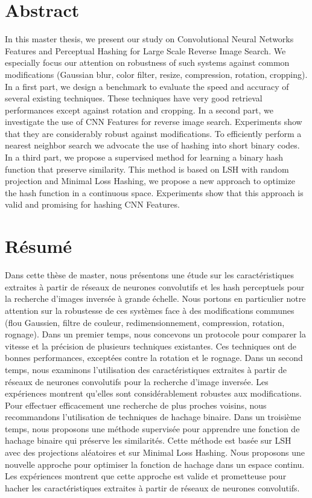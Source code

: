 \thispagestyle{plain}

\section*{Abstract}

In this master thesis, we present our study on Convolutional Neural Networks Features and Perceptual Hashing for Large Scale Reverse Image Search. We especially focus our attention on robustness of such systems against common modifications (Gaussian blur, color filter, resize, compression, rotation, cropping). In a first part, we design a benchmark to evaluate the speed and accuracy of several existing techniques. These techniques have very good retrieval performances except against rotation and cropping. In a second part, we investigate the use of CNN Features for reverse image search. Experiments show that they are considerably robust against modifications. To efficiently perform a nearest neighbor search we advocate the use of hashing into short binary codes. In a third part, we propose a supervised method for learning a binary hash function that preserve similarity. This method is based on LSH with random projection and Minimal Loss Hashing, we propose a new approach to optimize the hash function in a continuous space. Experiments show that this approach is valid and promising for hashing CNN Features.

\section*{R\'esum\'e}

Dans cette th\`ese de master, nous pr\'esentons une \'etude sur les caract\'eristiques extraites \`a partir de r\'eseaux de neurones convolutifs et les hash perceptuels pour la recherche d'images invers\'ee \`a grande \'echelle. Nous portons en particulier notre attention sur la robustesse de ces syst\`emes face \`a des modifications communes (flou Gaussien, filtre de couleur, redimensionnement, compression, rotation, rognage). Dans un premier temps, nous concevons un protocole pour comparer la vitesse et la pr\'ecision de plusieurs techniques existantes. Ces techniques ont de bonnes performances, except\'ees contre la rotation et le rognage. Dans un second temps, nous examinons l'utilisation des caract\'eristiques extraites \`a partir de r\'eseaux de neurones convolutifs pour la recherche d'image invers\'ee. Les exp\'eriences montrent qu'elles sont consid\'erablement robustes aux modifications. Pour effectuer efficacement une recherche de plus proches voisins, nous recommandons l'utilisation de techniques de hachage binaire. Dans un troisi\`eme temps, nous proposons une m\'ethode supervis\'ee pour apprendre une fonction de hachage binaire qui pr\'eserve les similarit\'es. Cette m\'ethode est bas\'ee sur LSH avec des projections al\'eatoires et sur Minimal Loss Hashing. Nous proposons une nouvelle approche pour optimiser la fonction de hachage dans un espace continu. Les exp\'eriences montrent que cette approche est valide et prometteuse pour hacher les caract\'eristiques extraites \`a partir de r\'eseaux de neurones convolutifs.